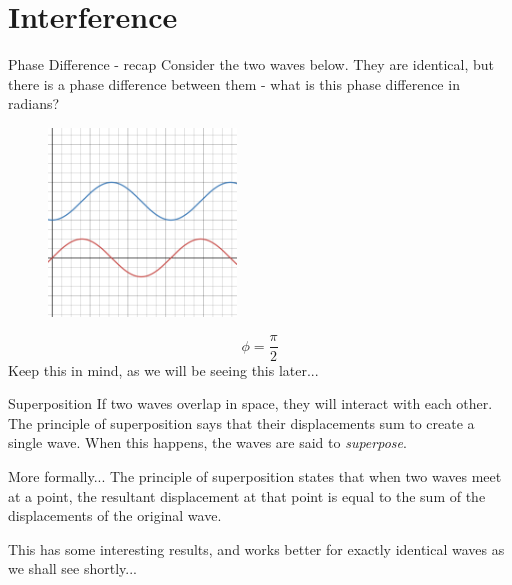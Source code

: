 \documentclass[../Main.tex]{subfiles}
\begin{document}
\author{Interference} %
\date{Year 1 Topic 18} %

\section{Interference} %

\begin{frame}{Phase Difference - recap}
Consider the two waves below. They are identical, but there is a phase difference between them - what is this phase difference in radians?
\begin{figure}
    \centering
    \includegraphics[width=5cm]{Waves_Images/wavesoutofphase.png}
\end{figure} \pause
\begin{equation*}
    \phi = \frac{\pi}{2}
\end{equation*}
Keep this in mind, as we will be seeing this later...
\end{frame}

\begin{frame}{Superposition}
    If two waves overlap in space, they will interact with each other. The principle of superposition says that their displacements sum to create a single wave. When this happens, the waves are said to \emph{superpose}.
    
    \begin{block}{More formally...}
    The principle of superposition states that when two waves meet at a point, the resultant displacement at that point is equal to the sum of the displacements of the original wave.
    \end{block}
    
    This has some interesting results, and works better for exactly identical waves as we shall see shortly...
\end{frame}
\end{document}
